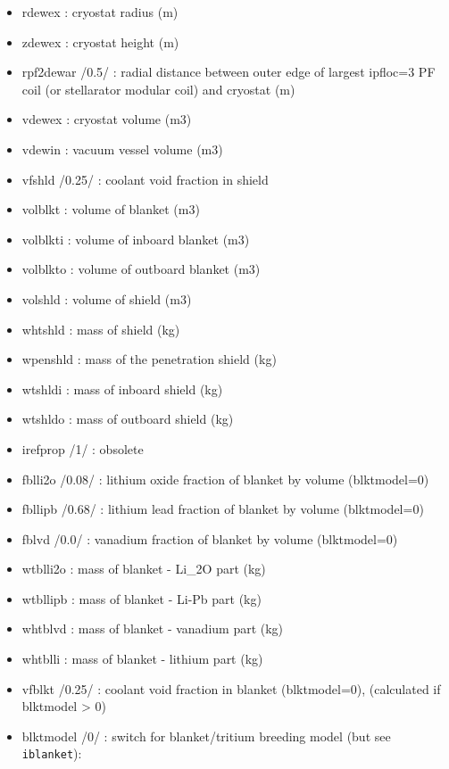 \documentclass[
]{article}
\begin{document}
\begin{itemize}
\begin{itemize}
  \item
    rdewex : cryostat radius (m)
  \item
    zdewex : cryostat height (m)
  \item
    rpf2dewar /0.5/ : radial distance between outer edge of largest
    ipfloc=3 PF coil (or stellarator modular coil) and cryostat (m)
  \item
    vdewex : cryostat volume (m3)
  \item
    vdewin : vacuum vessel volume (m3)
  \item
    vfshld /0.25/ : coolant void fraction in shield
  \item
    volblkt : volume of blanket (m3)
  \item
    volblkti : volume of inboard blanket (m3)
  \item
    volblkto : volume of outboard blanket (m3)
  \item
    volshld : volume of shield (m3)
  \item
    whtshld : mass of shield (kg)
  \item
    wpenshld : mass of the penetration shield (kg)
  \item
    wtshldi : mass of inboard shield (kg)
  \item
    wtshldo : mass of outboard shield (kg)
  \item
    irefprop /1/ : obsolete
  \item
    fblli2o /0.08/ : lithium oxide fraction of blanket by volume
    (blktmodel=0)
  \item
    fbllipb /0.68/ : lithium lead fraction of blanket by volume
    (blktmodel=0)
  \item
    fblvd /0.0/ : vanadium fraction of blanket by volume (blktmodel=0)
  \item
    wtblli2o : mass of blanket - Li\_2O part (kg)
  \item
    wtbllipb : mass of blanket - Li-Pb part (kg)
  \item
    whtblvd : mass of blanket - vanadium part (kg)
  \item
    whtblli : mass of blanket - lithium part (kg)
  \item
    vfblkt /0.25/ : coolant void fraction in blanket (blktmodel=0),
    (calculated if blktmodel \textgreater{} 0)
  \item
    blktmodel /0/ : switch for blanket/tritium breeding model (but see
    \texttt{iblanket}):


\end{itemize}
\end{itemize}
\end{document}

